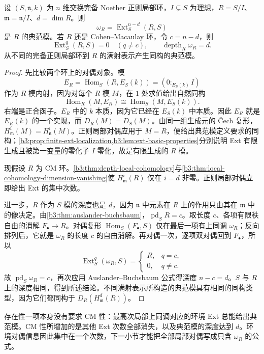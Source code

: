 \begin{proposition}\label{b3:prop:canonical-module-quotient}
	设 \((S,\mathfrak n,k)\) 为 \(n\) 维交换完备 Noether 正则局部环，\(I\subsetneq S\) 为理想，\(R=S/I\)、\(\mathfrak m=\mathfrak n/I\)、\(d=\dim R\)。则
	\[
		\omega_R=\operatorname{Ext}_S^{n-d}(R,S)
	\]
	是 \(R\) 的典范模。若 \(R\) 还是 Cohen–Macaulay 环，令 \(c=n-d\)，则
	\[
		\operatorname{Ext}_S^q(R,S)=0\quad(q\ne c), \qquad \operatorname{depth}_R\omega_R=d.
	\]
	从不同的完备正则局部环到 \(R\) 的满射表示产生同构的典范模。
\end{proposition}
\begin{proof}
	先比较两个环上的对偶对象。模
	\[
		E_R=\operatorname{Hom}_S(R,E_S(k))=(0:_{E_S(k)}I)
	\]
	作为 \(R\) 模内射，因为对每个 \(R\) 模 \(M\)，在 \(1\) 处求值给出自然同构
	\[
		\operatorname{Hom}_R(M,E_R)\cong\operatorname{Hom}_S(M,E_S(k)).
	\]
	右端是正合函子。\(E_R\) 中的 \(k\) 本质，因为它已经在 \(E_S(k)\) 中本质。因此 \(E_R\) 就是 \(E_R(k)\) 的一个实现，而 \(D_R(M)=D_S(M)\)。由同一组生成元的 Čech 复形，\(H^i_{\mathfrak m}(M)=H^i_{\mathfrak n}(M)\)。正则局部对偶应用于 \(M=R\)，便给出典范模定义要求的同构；\cref{b3:prop:finite-ext-localization,b3:lem:ext-basic-properties}分别说明 Ext 有限生成且被第一变量的零化子 \(I\) 零化，故是有限生成的 \(R\) 模。

	现假设 \(R\) 为 CM 环。\cref{b3:thm:depth-local-cohomology}与\cref{b3:thm:local-cohomology-dimension-vanishing}使 \(H^i_{\mathfrak m}(R)\) 仅在 \(i=d\) 非零。正则局部对偶立即给出 Ext 的集中次数。

	进一步，\(R\) 作为 \(S\) 模的深度也是 \(d\)，因为 \(\mathfrak n\) 中元素在 \(R\) 上的作用只由其在 \(\mathfrak m\) 中的像决定。由\cref{b3:thm:auslander-buchsbaum}，\(\operatorname{pd}_SR=c\)。取长度 \(c\)、各项有限秩自由的消解 \(F_\bullet\rightarrow R\)。对偶复形 \(\operatorname{Hom}_S(F_\bullet,S)\) 仅在最后一项有上同调 \(\omega_R\)；反向排列后，它就是 \(\omega_R\) 的长度 \(c\) 的自由消解。再对偶一次，逐项双对偶回到 \(F_\bullet\)，所以
	\[
		\operatorname{Ext}_S^q(\omega_R,S)=
		\begin{cases}R,&q=c,\\0,&q\ne c.\end{cases}
	\]
	故 \(\operatorname{pd}_S\omega_R=c\)，再次应用 Auslander–Buchsbaum 公式得深度 \(n-c=d\)。\(S\) 与 \(R\) 上的深度相同，得到所述结论。不同满射表示所构造的典范模具有相同的同构类型，因为它们都同构于 \(D_R(H^d_{\mathfrak m}(R))\)。
\end{proof}

存在性一项本身没有要求 CM 性：最高次局部上同调对应的环境 Ext 总能给出典范模。CM 性所增加的是其他 Ext 次数全部消失，以及典范模的深度达到 \(d\)。环境对偶信息因此集中在一个次数，下一小节才能把全部局部对偶写成只含 \(\omega_R\) 的公式。

